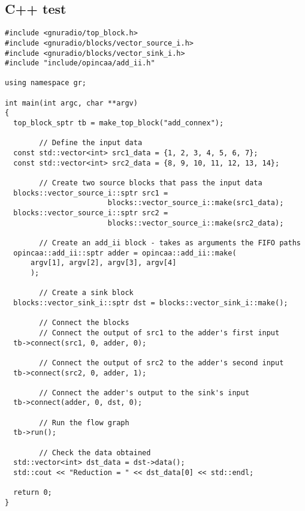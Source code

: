        \begin{minipage}{\linewidth}
        \subsection{C++ test}
        \label{ssec:test-cpp}
                \begin{lstlisting}
#include <gnuradio/top_block.h>
#include <gnuradio/blocks/vector_source_i.h>
#include <gnuradio/blocks/vector_sink_i.h>
#include "include/opincaa/add_ii.h"

using namespace gr;

int main(int argc, char **argv)
{
  top_block_sptr tb = make_top_block("add_connex");

        // Define the input data
  const std::vector<int> src1_data = {1, 2, 3, 4, 5, 6, 7};
  const std::vector<int> src2_data = {8, 9, 10, 11, 12, 13, 14};

        // Create two source blocks that pass the input data
  blocks::vector_source_i::sptr src1 =
                        blocks::vector_source_i::make(src1_data);
  blocks::vector_source_i::sptr src2 =
                        blocks::vector_source_i::make(src2_data);

        // Create an add_ii block - takes as arguments the FIFO paths
  opincaa::add_ii::sptr adder = opincaa::add_ii::make(
      argv[1], argv[2], argv[3], argv[4]
      );

        // Create a sink block
  blocks::vector_sink_i::sptr dst = blocks::vector_sink_i::make();

        // Connect the blocks
        // Connect the output of src1 to the adder's first input
  tb->connect(src1, 0, adder, 0);

        // Connect the output of src2 to the adder's second input
  tb->connect(src2, 0, adder, 1);

        // Connect the adder's output to the sink's input
  tb->connect(adder, 0, dst, 0);

        // Run the flow graph
  tb->run();

        // Check the data obtained
  std::vector<int> dst_data = dst->data();
  std::cout << "Reduction = " << dst_data[0] << std::endl;

  return 0;
}
                \end{lstlisting}
                \end{minipage}\\

